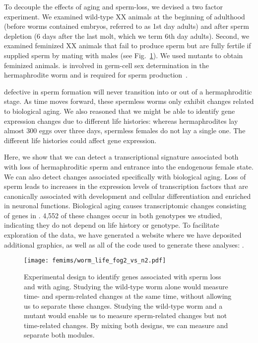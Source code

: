 To decouple the effects of aging and sperm-loss, we devised a two factor
experiment. We examined wild-type XX animals at the beginning of
adulthood (before worms contained embryos, referred to as 1st day adults) and
after sperm depletion (6 days after the last molt, which we term 6th day
adults). Second, we examined feminized XX animals that fail to produce sperm but
are fully fertile if supplied sperm by mating with males (see
Fig.~\ref{fig:wormlife}). We used \fog{} mutants to obtain feminized animals.
 is involved in germ-cell sex determination in the hermaphrodite
worm and is required for sperm production~\citep{Schedl1988,Clifford2000}.

\cel{} defective in sperm formation will never transition into or out of a
hermaphroditic stage. As time moves forward, these spermless worms only exhibit
changes related to biological aging. We also reasoned that we might be able to
identify gene expression changes due to different life histories: whereas
hermaphrodites lay almost 300 eggs over three days, spermless females do not lay
a single one. The different life histories could affect gene expression.

Here, we show that we can detect a transcriptional signature associated both
with loss of hermaphroditic sperm and entrance into the endogenous female state.
We can also detect changes associated specifically with biological aging.
Loss of sperm leads to increases in the expression levels of transcription
factors that are canonically associated with development and cellular
differentiation and enriched in neuronal functions.
Biological aging causes transcriptomic changes consisting of \agen{} genes
in \cel{}. 4,552 of these changes occur in both genotypes we studied,
indicating they do not depend on life history or genotype. To facilitate
exploration of the data, we have generated a website where we have deposited
additional graphics, as well as all of the code used to generate these analyses:
\website{}.

\begin{figure}[htbp]
\renewcommand{\familydefault}{\sfdefault}\normalfont{}
\centering
\texttt{[image: femims/worm\_life\_fog2\_vs\_n2.pdf]}
\caption{Experimental design to identify genes associated with sperm loss and
with aging. Studying the wild-type worm alone would measure time- and
sperm-related changes at the same time, without allowing us to separate these
changes. Studying the wild-type worm and a \fog{} mutant would enable us to
measure sperm-related changes but not time-related changes. By mixing both
designs, we can measure and separate both modules.
}%
\label{fig:wormlife}
\end{figure}


